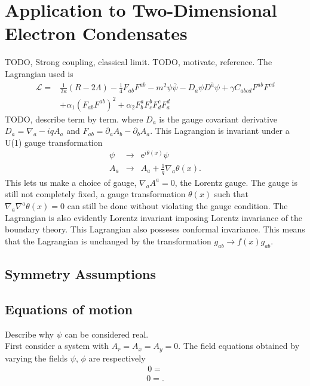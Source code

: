 \documentclass[12pt]{article}
\begin{document}
\section{Application to Two-Dimensional Electron Condensates}
TODO, Strong coupling, classical limit.
TODO, motivate, reference. The Lagrangian used is
\begin{eqnarray}
 \mathcal{L}=&\frac{1}{2\kappa}\left(R-2\Lambda\right)-\frac{1}{4}F_{ab}F^{ab}-m^2\psi\overline{\psi}-D_a\psi\overline{D^a\psi}
+\gamma C_{abcd}F^{ab}F^{cd}\nonumber\\
&+\alpha_1(F_{ab}F^{ab})^2+\alpha_2F^a_bF^b_cF^c_dF^d_a
\end{eqnarray}
TODO, describe term by term.
where $D_a$ is the gauge covariant derivative $D_a=\nabla_a-iqA_a$ and $F_{ab}=\partial_aA_b-\partial_bA_a$. This Lagrangian is invariant under a U(1) gauge transformation
\begin{eqnarray}
 \psi&\rightarrow&\mathrm{e}^{i\theta(x)}\psi\\
 A_a&\rightarrow& A_a+\frac{1}{q}\nabla_a\theta(x).
\end{eqnarray}
This lets us make a choice of gauge, $\nabla_aA^a=0$, the Lorentz gauge. The gauge is still not completely fixed, a gauge transformation $\theta(x)$ such that $\nabla_a\nabla^a\theta(x)=0$ can still be done without violating the gauge condition.
The Lagrangian is also evidently Lorentz invariant imposing Lorentz invariance of the boundary theory. This Lagrangian also posseses conformal invariance. This means that the Lagrangian is unchanged by the transformation $g_{ab}\rightarrow f(x)g_{ab}$.
\subsection{Symmetry Assumptions}
\subsection{Equations of motion}
Describe why $\psi$ can be considered real.\\
First consider a system with $A_r=A_x=A_y=0$. The field equations obtained by varying the fields $\psi$, $\phi$ are respectively
\begin{eqnarray}
0=
\end{eqnarray}
\begin{eqnarray}
0=.
\end{eqnarray}
\end{document}
